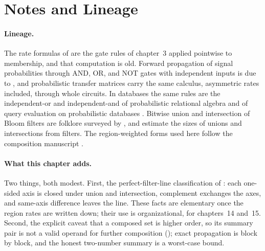 %

\section{Notes and Lineage}
\label{sec:bib-notes-ch6}

\paragraph{Lineage.}
The rate formulas of  are the gate
rules of chapter~3 applied pointwise to membership, and that computation is
old. Forward propagation of signal probabilities
through AND, OR, and NOT gates with independent inputs is due to
\textcite{parker-mccluskey-1975}, and probabilistic transfer
matrices
\parencite{krishnaswamy-et-al-2008} carry the
same calculus, asymmetric rates included, through whole circuits. In
databases the same rules are the independent-or and independent-and of
probabilistic relational algebra
\parencite{fuhr-roelleke-1997} and of query evaluation on probabilistic
databases \parencite{dalvi-suciu-2007}. Bitwise
union and intersection of Bloom filters are folklore surveyed by
\textcite{broder-mitzenmacher-2004}, and \textcite{papapetrou-siberski-nejdl-2010}
estimate the sizes of unions and intersections from filters. The
region-weighted forms used here follow the composition manuscript
\textcite{towell-bernoulli-composition}.

\paragraph{What this chapter adds.}
Two things, both modest. First, the perfect-filter-line classification of
: each one-sided axis is
closed under union and intersection, complement exchanges the axes, and
same-axis difference leaves the line. These facts are elementary once the
region rates are written down; their use is organizational, for chapters~14
and~15. Second, the explicit caveat that a composed set is higher order, so
its summary pair is not a valid operand for further composition
(); exact propagation is block by block, and the
honest two-number summary is a worst-case bound.

